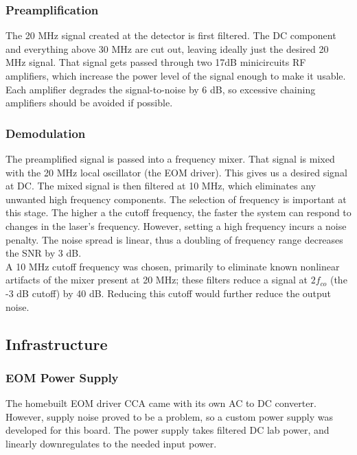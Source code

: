     \subsubsection{Preamplification}

The 20 MHz signal created at the detector is first filtered.  The DC component and everything above 30 MHz are cut out, leaving ideally just the desired 20 MHz signal.  That signal gets passed through two 17dB minicircuits RF amplifiers, which increase the power level of the signal enough to make it usable.  Each amplifier degrades the signal-to-noise by 6 dB, so excessive chaining amplifiers should be avoided if possible.

    \subsubsection{Demodulation}

The preamplified signal is passed into a frequency mixer.  That signal is mixed with the 20 MHz local oscillator (the EOM driver).  This gives us a desired signal at DC.  The mixed signal is then filtered at 10 MHz, which eliminates any unwanted high frequency components.  The selection of frequency is important at this stage.  The higher a the cutoff frequency, the faster the system can respond to changes in the laser's frequency. However, setting a high frequency incurs a noise penalty.  The noise spread is linear, thus a doubling of frequency range decreases the SNR by 3 dB. \\

A 10 MHz cutoff frequency was chosen, primarily to eliminate known nonlinear artifacts of the mixer present at 20 MHz; these filters reduce a signal at $2f_{co}$ (the -3 dB cutoff) by 40 dB.  Reducing this cutoff would further reduce the output noise.

\subsection{Infrastructure}
    \subsubsection{EOM Power Supply}

The homebuilt EOM driver CCA came with its own AC to DC converter.  However, supply noise proved to be a problem, so a custom power supply was developed for this board.  The power supply takes filtered DC lab power, and linearly downregulates to the needed input power.

